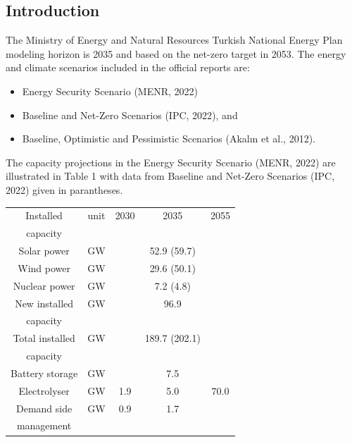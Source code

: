 \documentclass[a0,portrait]{a0poster}
\begin{document}
\begin{multicols}{3} %


\section{Introduction}

\Large 

The Ministry of Energy and Natural Resources Turkish National Energy Plan modeling horizon is 2035 and based on the net-zero target in 2053. The energy and climate scenarios included in the official reports are: 

\begin{itemize}
\item Energy Security Scenario (MENR, 2022)
\item Baseline and Net-Zero Scenarios (IPC, 2022), and 
\item Baseline, Optimistic and Pessimistic Scenarios (Akalın et al., 2012). 
\end{itemize}

The capacity projections in the Energy Security Scenario (MENR, 2022) are illustrated in Table 1 with data from Baseline and Net-Zero Scenarios (IPC, 2022) given in parantheses.

\begin{center}
 \vspace{2cm}
 \begin{tabular}{c c c c c} 
  \toprule
  Installed & unit & 2030 & 2035 & 2055 \\ [0.5ex] 
  capacity &&&& \\
  \midrule
  \rowcolor{LightCyan}
  Solar power & GW &  & 52.9 (59.7) & \\ 
  Wind power & GW &  & 29.6 (50.1) & \\
  \rowcolor{LightCyan}
  Nuclear power & GW &  & 7.2 (4.8) & \\
  New installed & GW &  & 96.9 & \\
  capacity &&&& \\
  \rowcolor{LightCyan}
  Total installed & GW &  & 189.7 (202.1) & \\
  \rowcolor{LightCyan}
  capacity &&&& \\
  Battery storage & GW &  & 7.5 & \\
  \rowcolor{LightCyan}
  Electrolyser & GW & 1.9 & 5.0 & 70.0 \\
  Demand side & GW & 0.9 & 1.7 & \\
  management &&&& \\
  \bottomrule
 \end{tabular}
\vspace{2cm}
\end{center}


\end{multicols}
\end{document}
